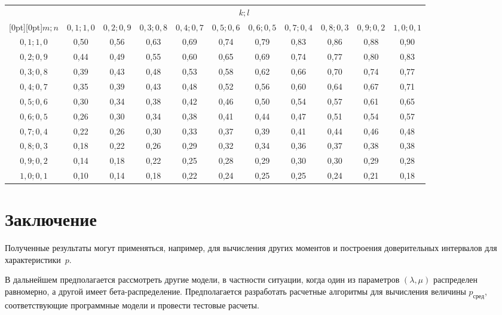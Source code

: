 \begin{multicols}{2}
\begin{table*}
\begin{center}
\tabcolsep=5pt
\begin{tabular}{|c|c|c|c|c|c|c|c|c|c|c|}
 \hline
 &\multicolumn{10}{c|}{$k;l$}\\
 \cline{2-11}
 \multicolumn{1}{|c|}{\raisebox{6pt}[0pt][0pt]{$m;n$ }}&
  ${0{,}1; 1{,}0}$ & ${0{,}2; 0{,}9}$ & ${0{,}3; 0{,}8}$ &
  ${0{,}4; 0{,}7}$ & ${0{,}5; 0{,}6}$ & ${0{,}6; 0{,}5}$ &
  ${0{,}7; 0{,}4}$ & ${0{,}8; 0{,}3}$ & ${0{,}9; 0{,}2}$ & ${1{,}0; 0{,}1}$\\
 \hline
${0{,}1; 1{,}0}$&0,50&0,56&0,63&0,69&0,74&0,79&0,83&0,86&0,88&0,90\\
${0{,}2; 0{,}9}$&0,44&0,49&0,55&0,60&0,65&0,69&0,74&0,77&0,80&0,83\\
${0{,}3; 0{,}8}$&0,39&0,43&0,48&0,53&0,58&0,62&0,66&0,70&0,74&0,77\\
${0{,}4; 0{,}7}$&0,35&0,39&0,43&0,48&0,52&0,56&0,60&0,64&0,67&0,71\\
${0{,}5; 0{,}6}$&0,30&0,34&0,38&0,42&0,46&0,50&0,54&0,57&0,61&0,65\\
${0{,}6; 0{,}5}$&0,26&0,30&0,34&0,38&0,41&0,44&0,47&0,51&0,54&0,57\\
${0{,}7; 0{,}4}$&0,22&0,26&0,30&0,33&0,37&0,39&0,41&0,44&0,46&0,48\\
${0{,}8; 0{,}3}$&0,18&0,22&0,26&0,29&0,32&0,34&0,36&0,37&0,38&0,38\\
${0{,}9; 0{,}2}$&0,14&0,18&0,22&0,25&0,28&0,29&0,30&0,30&0,29&0,28\\
${1{,}0; 0{,}1}$&0,10&0,14&0,18&0,22&0,24&0,25&0,25&0,24&0,21&0,18\\
 \hline
 \end{tabular}
 \end{center}
 \end{table*}

\section{Заключение}

Полученные результаты могут применяться, например, для вычисления
других моментов и построения доверительных интервалов для характеристики~$p$.

В дальнейшем предполагается  рассмотреть другие модели, в частности
ситуации, когда один из параметров $(\lambda, \mu)$ распределен
равномерно, а другой имеет бе\-та-рас\-пре\-де\-ле\-ние. Предполагается
разработать расчетные алгоритмы для вычисления величины
$p_{\mathrm{сред}}$, соответствующие программные модели и
провести тестовые расчеты.


\end{multicols}
